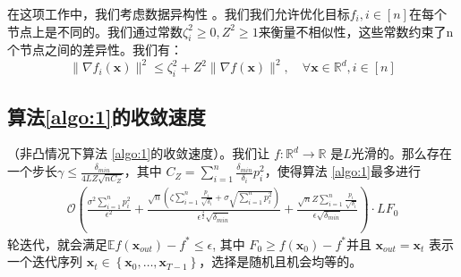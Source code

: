 \begin{assumption}
在这项工作中，我们考虑数据异构性 \cite{stich2020communication}。我们我们允许优化目标$f_i,i \in [n]$在每个节点上是不同的。我们通过常数$\zeta_i^2 \geq 0,Z^2 \geq 1$来衡量不相似性，这些常数约束了n个节点之间的差异性。我们有：
\begin{equation}
\lVert \nabla f_i(\textbf{x}) \rVert^2 \leq \zeta_i^2+Z^2\lVert\nabla f(\textbf{x})\rVert^2, \quad \forall \textbf{x} \in \mathbb{R}^d,i \in [n] \nonumber
\end{equation}
\label{assumption:4}
\end{assumption}

\subsection{算法\ref{algo:1}的收敛速度}

\begin{theorem}
（非凸情况下算法 \ref{algo:1}的收敛速度）。我们让 $f: \mathbb{R}^d \rightarrow \mathbb{R}$ 是$L$光滑的。那么存在一个步长$\gamma \leq \frac{\delta_{min}}{4LZ\sqrt{n C_Z}}$，其中 $C_Z = \sum_{i=1}^n\frac{\delta_{min}}{\delta_i}p_i^2$，使得算法 \ref{algo:1}最多进行
\begin{equation}
\begin{split}
    \mathcal{O}(\frac{\sigma^2\sum_{i=1}^n p_i^2}{\epsilon^2}+\frac{\sqrt{n}(\zeta\sum_{i=1}^n\frac{p_i}{\sqrt{\delta_i}}+\sigma\sqrt{\sum_{i=1}^n p_i^2})}{\epsilon^{\frac{3}{2}} \sqrt{\delta_{min}} }
    +\frac{\sqrt{n} Z\sum_{i=1}^n\frac{p_i}{\sqrt{\delta_i}}}{\epsilon \sqrt{\delta_{min}}})\cdot L F_0 
\end{split}
\label{theorem:1}
\end{equation}
轮迭代，就会满足$\mathbb{E}f(\textbf{x}_{out})-f^* \leq \epsilon $, 其中 $F_0 \geq f(\textbf{x}_0)-f^*$并且 $\textbf{x}_{out} = \textbf{x}_t$ 表示一个迭代序列 $\textbf{x}_t \in \left\{\textbf{x}_0, \ldots, \textbf{x}_{T-1}\right\}$，选择是随机且机会均等的。

\end{theorem}

